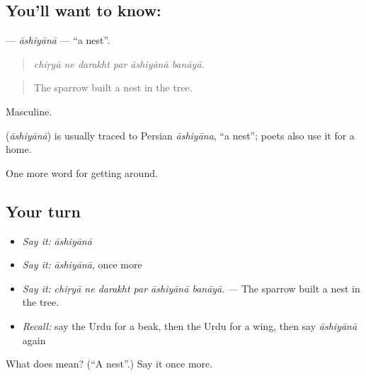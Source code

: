 \subsection*{You'll want to know: }
\textbf{} — \emph{āshiyānā} — \textquotedblleft{}a nest\textquotedblright{}.

\begin{quote}
     
\end{quote}

\begin{quote}
\emph{chiṛyā ne darakht par āshiyānā banāyā.}
\end{quote}

\begin{quote}
The sparrow built a nest in the tree.
\end{quote}

Masculine.

\begin{cousinweb}
\textbf{} (\emph{āshiyānā}) is usually traced to Persian \emph{āshiyāna}, \textquotedblleft{}a nest\textquotedblright{}; poets also use it for a home.
\end{cousinweb}

\begin{grammarlens}[title={What you've built}]
One more word for getting around.
\end{grammarlens}

\subsection*{Your turn}
\begin{itemize}
\raggedright
  \item \emph{Say it:} \emph{āshiyānā}
  \item \emph{Say it:} \emph{āshiyānā}, once more
  \item \emph{Say it:} \emph{chiṛyā ne darakht par āshiyānā banāyā.} — The sparrow built a nest in the tree.
  \item \emph{Recall:} say the Urdu for a beak, then the Urdu for a wing, then say \emph{āshiyānā} again
\end{itemize}

\begin{tcolorbox}[breakable,colback=teal!4,colframe=teal!35!black,title={Before you move on}]
What does  mean? (\textquotedblleft{}A nest\textquotedblright{}.) Say it once more.
\end{tcolorbox}
